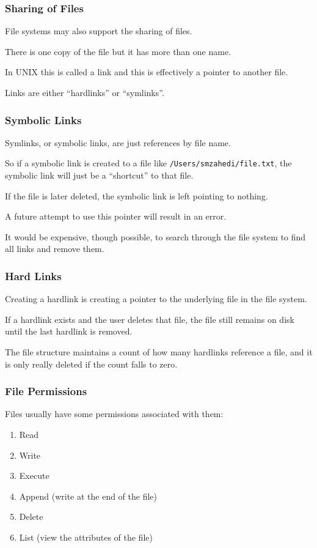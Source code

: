 \begin{frame}
	\frametitle{Sharing of Files}

	File systems may also support the sharing of files.

	There is one copy of the file but it has more than one name.

	In UNIX this is called a \alert{link} and this is effectively a pointer to another file.

	Links are either ``hardlinks'' or ``symlinks''.

\end{frame}

\begin{frame}
	\frametitle{Symbolic Links}

	Symlinks, or symbolic links, are just references by file name.

	So if a symbolic link is created to a file like \texttt{/Users/smzahedi/file.txt}, the symbolic link will just be a ``shortcut'' to that file.

	If the file is later deleted, the symbolic link is left pointing to nothing.

	A future attempt to use this pointer will result in an error.

	It would be expensive, though possible, to search through the file system to find all links and remove them.


\end{frame}

\begin{frame}
	\frametitle{Hard Links}

	Creating a hardlink is creating a pointer to the underlying file in the file system.

	If a hardlink exists and the user deletes that file, the file still remains on disk until the last hardlink is removed.

	The file structure maintains a count of how many hardlinks reference a file, and it is only really deleted if the count falls to zero.


\end{frame}



\begin{frame}
	\frametitle{File Permissions}

	Files usually have some permissions associated with them:

	\begin{enumerate}
		\item Read
		\item Write
		\item Execute
		\item Append (write at the end of the file)
		\item Delete
		\item List (view the attributes of the file)
	\end{enumerate}

\end{frame}

